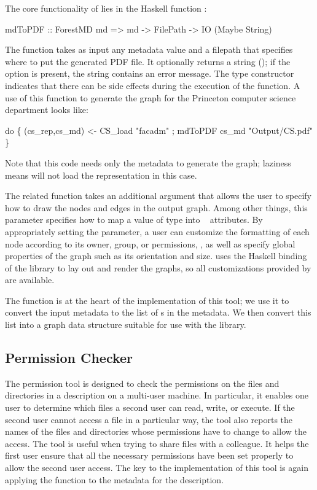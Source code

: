 The core functionality of \fg{} lies in the Haskell function :
\begin{code}
mdToPDF :: ForestMD md => 
     md -> FilePath -> IO (Maybe String)
\end{code}
The function takes as input any metadata value and a
filepath that specifies where to 
put the generated PDF file.  It optionally returns a string (); if the option is present, the string contains an error
message.  The  type constructor indicates that there can be
side effects during the execution of the function.  A use of
this function to generate the graph for the Princeton computer science
department \filestore{} looks like:
\begin{code}
 do \{ (cs_rep,cs_md) <- CS_load  "facadm"
    ; mdToPDF cs_md "Output/CS.pdf"       \}
\end{code}
Note that this code needs only the metadata to generate the graph;
laziness means \forest{} will not load the representation in this
case. 

The related function  takes an additional
argument that allows the user to specify how to draw the nodes and
edges in the output graph.  Among other things, this parameter
specifies how to map a value of type  into
\graphviz{}~\cite{haskell-graphviz,Gansner+:graphviz} attributes.  By appropriately setting the
parameter, a user can customize the formatting of each node according
to its owner, group, or permissions, \etc{}, as well as specify global
properties of the graph such as its orientation and size.  \fg{} uses
the Haskell binding of the \graphviz{} library to lay out and render
the graphs, so all customizations provided by \graphviz{} are
available.

The  function is at the heart of the implementation of
this tool; we use it to convert the input metadata to the list of
s in the metadata.  We then convert this list into a
graph data structure suitable for use with the \graphviz{} library.

\subsection{Permission Checker}
The permission tool is designed to check the permissions on the files
and directories in a \forest{} description on a multi-user machine.
In particular, it enables one user to determine which files a second
user can read, write, or execute.  If the second user cannot access a
file in a particular way, the tool also reports the names of the files
and directories whose permissions have to change to allow the access.
The tool is useful when trying to share files with a colleague.  It
helps the first user ensure that all the necessary permissions
have been set properly to allow the second user access.  The key to
the implementation of this tool is again applying the 
function to the metadata for the \forest{} description.

